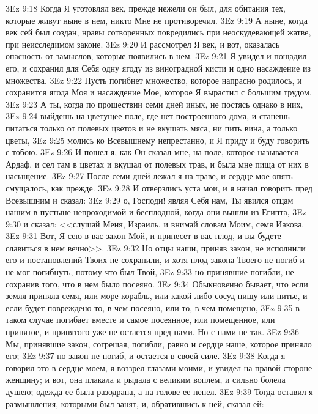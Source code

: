 \vs 3Ez 9:18 Когда Я уготовлял век, прежде нежели он был, для обитания тех, которые живут ныне в нем, никто Мне не противоречил.
\vs 3Ez 9:19 А ныне, когда век сей был создан, нравы сотворенных повредились при неоскудевающей жатве, при неисследимом законе.
\vs 3Ez 9:20 И рассмотрел Я век, и вот, оказалась опасность от замыслов, которые появились в нем.
\vs 3Ez 9:21 Я увидел и пощадил его, и сохранил для Себя одну ягоду из виноградной кисти и одно насаждение из множества.
\vs 3Ez 9:22 Пусть погибнет множество, которое напрасно родилось, и сохранится ягода Моя и насаждение Мое, которое Я вырастил с большим трудом.
\vs 3Ez 9:23 А ты, когда по прошествии семи дней иных, не постясь однако в них,
\vs 3Ez 9:24 выйдешь на цветущее поле, где нет построенного дома, и станешь питаться только от полевых цветов и не вкушать мяса, ни пить вина, а только цветы,
\vs 3Ez 9:25 молись ко Всевышнему непрестанно, и Я приду и буду говорить с тобою.
\vs 3Ez 9:26 И пошел я, как Он сказал мне, на поле, которое называется Ардаф, и сел там в цветах и вкушал от полевых трав, и была мне пища от них в насыщение.
\vs 3Ez 9:27 После семи дней лежал я на траве, и сердце мое опять смущалось, как прежде.
\vs 3Ez 9:28 И отверзлись уста мои, и я начал говорить пред Всевышним и сказал:
\vs 3Ez 9:29 о, Господи! являя Себя нам, Ты явился отцам нашим в пустыне непроходимой и бесплодной, когда они вышли из Египта,
\vs 3Ez 9:30 и сказал: <<слушай Меня, Израиль, и внимай словам Моим, семя Иакова.
\vs 3Ez 9:31 Вот, Я сею в вас закон Мой, и принесет в вас плод, и вы будете славиться в нем вечно>>.
\vs 3Ez 9:32 Но отцы наши, приняв закон, не исполнили его и постановлений Твоих не сохранили, и хотя плод закона Твоего не погиб и не мог погибнуть, потому что был Твой,
\vs 3Ez 9:33 но принявшие  погибли, не сохранив того, что в нем было посеяно.
\vs 3Ez 9:34 Обыкновенно бывает, что если земля приняла семя, или море корабль, или какой-либо сосуд пищу или питье, и если будет повреждено то, в чем посеяно, или то, в чем помещено,
\vs 3Ez 9:35 в таком случае погибает вместе и самое посеянное, или помещенное, или принятое, и принятого уже не остается пред нами. Но с нами не так.
\vs 3Ez 9:36 Мы, принявшие закон, согрешая, погибли, равно и сердце наше, которое приняло его;
\vs 3Ez 9:37 но закон не погиб, и остается в своей силе.
\vs 3Ez 9:38 Когда я говорил это в сердце моем, я воззрел глазами моими, и увидел на правой стороне женщину; и вот, она плакала и рыдала с великим воплем, и сильно болела душею; одежда ее была разодрана, а на голове ее пепел.
\vs 3Ez 9:39 Тогда оставил я размышления, которыми был занят, и, обратившись к ней, сказал ей:
